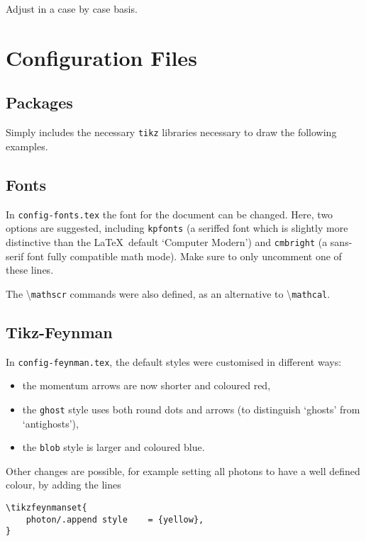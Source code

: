 \documentclass[12pt]{article}
\begin{document}
Adjust in a case by case basis.

\section{Configuration Files}


\subsection{Packages}

Simply includes the necessary \texttt{tikz} libraries necessary to draw the following examples.

\subsection{Fonts}

In \texttt{config-fonts.tex} the font for the document can be changed. Here, two options are suggested, including \texttt{kpfonts} (a seriffed font which is slightly more distinctive than the \LaTeX\, default `Computer Modern') and \texttt{cmbright} (a sans-serif font fully compatible math mode). Make sure to only uncomment one of these lines.

The \textbackslash\texttt{mathscr} commands were also defined, as an alternative to \textbackslash\texttt{mathcal}.

\subsection{Tikz-Feynman}

In \texttt{config-feynman.tex}, the default styles were customised in different ways:

\begin{itemize}
	\item the momentum arrows are now shorter and coloured red,
	\item the \texttt{ghost} style uses both round dots and arrows (to distinguish `ghosts' from `antighosts'),
	\item the \texttt{blob} style is larger and coloured blue.
\end{itemize}

Other changes are possible, for example setting all photons to have a well defined colour, by adding the lines

\begin{verbatim}
\tikzfeynmanset{
	photon/.append style	= {yellow},
}
\end{verbatim}
\end{document}
